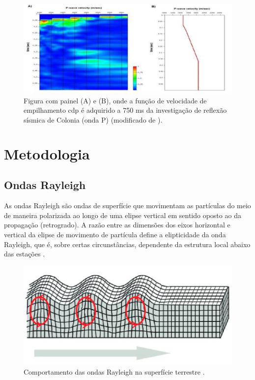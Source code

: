 \documentclass[smallextended]{svjour3}       %
\begin{document}
\begin{figure}[!hbtp]
  \begin{center}
  
  \includegraphics[scale=0.5]{Figures/fig2.png}
  \end{center}
  \caption{Figura com painel (A) e (B), onde a função de velocidade de empilhamento cdp é adquirido a 750 ms da investigação de reflexão sísmica de Colonia (onda P) (modificado de \citealp{riccomini2011colonia}).
  }
  \label{fun_vel}
\end{figure}


\section{Metodologia}
\label{methods}

\subsection{Ondas Rayleigh}

As ondas Rayleigh são ondas de superfície que movimentam as partículas do meio de maneira polarizada ao longo de uma elipse vertical em sentido oposto ao da propagação (retrogrado). A razão entre as dimensões dos eixos horizontal e vertical da elipse de movimento de partícula define a elipticidade da onda Rayleigh, que é, sobre certas circunstâncias, dependente da estrutura local abaixo das estações \citep{berbellini2019constraining}.

\begin{figure}[!hbtp]
\begin{center}

\includegraphics[scale=0.5]{Figures/ondas_rayleigh.png}
\end{center}
\caption{Comportamento das ondas Rayleigh na superfície terrestre \citep{de2009filtragem}.}
\label{ondas_rayleigh}
\end{figure}
\end{document}
